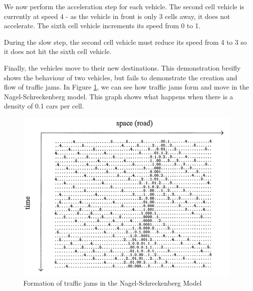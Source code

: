 \documentclass[ draft,
                    author={Alexander Hill},
                supervisor={Dr. Benjamin Sach},
                    degree={MEng},
                     title={MARMOSET: Multi Agent Real-time Multi-core Online
                     Simulation for Efficient Transportation},
                  subtitle={},
                      type={research},
                      year={2016} ]{dissertation}
\begin{document}
\begin{figure}[!h]
\centering
{}
\end{figure}

We now perform the acceleration step for each vehicle. The second cell vehicle is
currently at speed 4 - as the vehicle in front is only 3 cells away, it does not
accelerate. The sixth cell vehicle increments its speed from 0 to 1.

During the slow step, the second cell vehicle must reduce its speed from 4 to 3
so it does not hit the sixth cell vehicle.

\begin{figure}[!h]
\centering
{}
\end{figure}

Finally, the vehicles move to their new destinations. This demonstration breifly
shows the behaviour of two vehicles, but fails to demonstrate the creation and
flow of traffic jams. In Figure \ref{nagel-demo}, we can see how traffic jams
form and move in the Nagel-Schreckenberg model. This graph shows what happens
when there is a density of 0.1 cars per cell.

\begin{figure}[t]
    \centering
    \includegraphics[scale=0.4]{nagel}
    \caption{Formation of traffic jams in the Nagel-Schreckenberg Model}\label{nagel-demo}
\end{figure}
\end{document}
